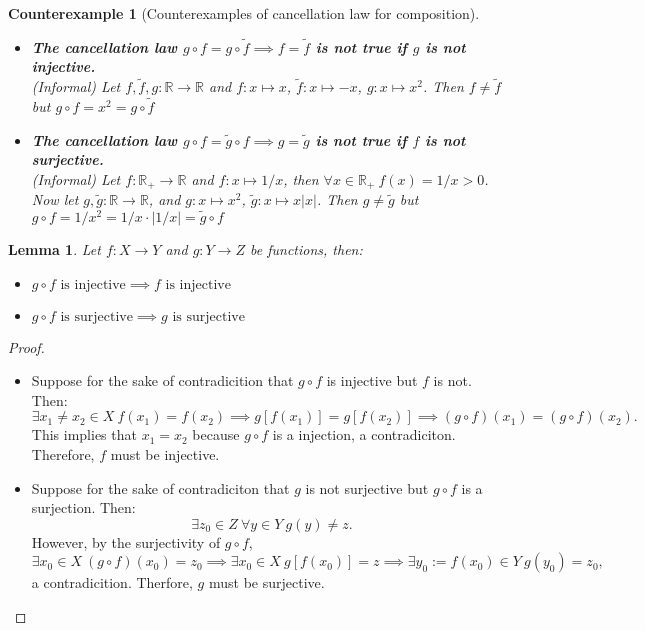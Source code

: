 \documentclass[a4paper]{book}
\newtheorem*{proof}{\textit{Proof.}}
\theoremstyle{break}
\newtheorem{counterexample}{\hspace{-30pt}\protect\dbend\hspace{15pt}Counterexample}[section]
\newtheorem{lemma}{Lemma}[section]
\begin{document}
			\begin{counterexample}[Counterexamples of cancellation law for composition]
				\begin{itemize}
					\item \textbf{The cancellation law $g\circ f=g\circ\tilde{f}\implies f=\tilde{f}$ is not true if $g$ is not injective.}\\
					(Informal) Let $f,\tilde{f},g:\mathbb{R}\to\mathbb{R}$ and $f:x\mapsto x$, $\tilde{f}:x\mapsto-x$, $g:x\mapsto x^2$. Then $f\neq\tilde{f}$ but $g\circ f=x^2=g\circ\tilde{f}$
					\item \textbf{The cancellation law $g\circ f=\tilde{g}\circ f\implies g=\tilde{g}$ is not true if $f$ is not surjective.}\\
					(Informal) Let $f:\mathbb{R}_+\to\mathbb{R}$ and $f:x\mapsto 1/x$, then $\forall x\in\mathbb{R}_+~f(x)=1/x>0$.\\
					Now let $g,\tilde{g}:\mathbb{R}\to\mathbb{R}$, and $g:x\mapsto x^2$, $\tilde{g}:x\mapsto x|x|$. Then $g\neq\tilde{g}$ but $g\circ f=1/x^2=1/x\cdot|1/x|=\tilde{g}\circ f$
				\end{itemize}
			\end{counterexample}
			\begin{lemma}
				Let $f:X\to Y$ and $g:Y\to Z$ be functions, then:
				\begin{itemize}
					\item $g\circ f\text{~is~injective}\implies f\text{~is injective}$
					\item $g\circ f\text{~is~surjective}\implies g\text{~is surjective}$
				\end{itemize}
			\end{lemma}
			\begin{proof}~
				\begin{itemize}
					\item Suppose for the sake of contradicition that $g\circ f$ is injective but $f$ is not. Then: 
					$$\exists x_1\neq x_2\in X~f(x_1)=f(x_2)\implies g[f(x_1)]=g[f(x_2)]\implies (g\circ f)(x_1)=(g\circ f)(x_2).$$
					This implies that $x_1=x_2$ because $g\circ f$ is a injection, a contradiciton. Therefore, $f$ must be injective.
					\item Suppose for the sake of contradiciton that $g$ is not surjective but $g\circ f$ is a surjection. Then: 
					$$\exists z_0\in Z~\forall y\in Y~g(y)\neq z.$$
					However, by the surjectivity of $g\circ f$,
					$$\exists x_0\in X~(g\circ f)(x_0)=z_0\implies\exists x_0\in X~g[f(x_0)]=z\implies \exists y_0:=f(x_0)\in Y~g(y_0)=z_0,$$
					a contradicition. Therfore, $g$ must be surjective.
				\end{itemize}
			\end{proof}
\end{document}
